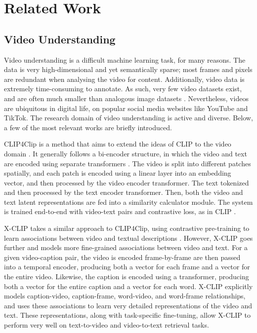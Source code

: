 \section{Related Work}

\subsection{Video Understanding}

Video understanding is a difficult machine learning task, for many reasons.
The data is very high-dimensional and yet semantically sparse; most frames and pixels are redundant when analysing the video for content.
Additionally, video data is extremely time-consuming to annotate.
As such, very few video datasets exist, and are often much smaller than analogous image datasets \cite{imagenet} \cite{coco}.
Nevertheless, videos are ubiquitous in digital life, on popular social media websites like YouTube and TikTok. 
The research domain of video understanding is active and diverse.
Below, a few of the most relevant works are briefly introduced.

CLIP4Clip is a method that aims to extend the ideas of CLIP \cite{clip} to the video domain \cite{clip4clip}.
It generally follows a bi-encoder structure, in which the video and text are encoded using separate transformers \cite{transformer}.
The video is split into different patches spatially, and each patch is encoded using a linear layer into an embedding vector, and then processed by the video encoder transformer.
The text tokenized and then processed by the text encoder transformer.
Then, both the video and text latent representations are fed into a similarity calculator module.
The system is trained end-to-end with video-text pairs and contrastive loss, as in CLIP \cite{clip}.

X-CLIP takes a similar approach to CLIP4Clip, using contrastive pre-training to learn associations between video and textual descriptions \cite{xclip}.
However, X-CLIP goes further and models more fine-grained associations between video and text.
For a given video-caption pair, the video is encoded frame-by-frame are then passed into a temporal encoder, producing both a vector for each frame and a vector for the entire video.
Likewise, the caption is encoded using a transformer, producing both a vector for the entire caption and a vector for each word.
X-CLIP explicitly models caption-video, caption-frame, word-video, and word-frame relationships, and uses these associations to learn very detailed representations of the video and text.
These representations, along with task-specific fine-tuning, allow X-CLIP to perform very well on text-to-video and video-to-text retrieval tasks.

